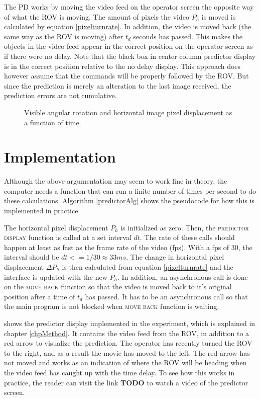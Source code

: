 The PD works by moving the video feed on the operator screen the opposite way of what the ROV is moving. The amount of pixels the video $P_h$ is moved is calculated by equation \ref{pixelturnrate}. In addition, the video is moved back (the same way as the ROV is moving) after $t_d$ seconds has passed. This makes the objects in the video feed appear in the correct position on the operator screen as if there were no delay. Note that the black box in  center column predictor display is in the correct position relative to the no delay display. This approach does however assume that the commands will be properly followed by the ROV. But since the prediction is merely an alteration to the last image received, the prediction errors are not cumulative.


\begin{figure}[h!]    
    \centering           
    \def\svgwidth{\columnwidth}
    
    \caption{Visible angular rotation and horizontal image pixel displacement as a function of time.}
    \label{timePlot}
\end{figure}

\section{Implementation}

Although the above argumentation may seem to work fine in theory, the computer needs a function that can run a finite number of times per second to do these calculations. Algorithm \ref{predictorAlg} shows the pseudocode for how this is implemented in practice.

The horizontal pixel displacement $P_h$ is initialized as zero. Then, the \textsc{predictor display} function is called at a set interval $dt$. The rate of these calls should happen at least as fast as the frame rate of the video (fps). With a fps of 30, the interval should be $dt <= 1/30 \approx 33 ms$. The change in horizontal pixel displacement $\Delta P_h$ is then calculated from equation \ref{pixelturnrate} and the interface is updated with the new $P_h$. In addition, an asynchronous call is done on the \textsc{move back} function so that the video is moved back to it's original position after a time of $t_d$ has passed. It has to be an asynchronous call so that the main program is not blocked when \textsc{move back} function is waiting.




 shows the predictor display implemented in the experiment, which is explained in chapter \ref{chpMethod}. It contains the video feed from the ROV, in addition to a red arrow to visualize the prediction. The operator has recently turned the ROV to the right, and as a result the movie has moved to the left. The red arrow has not moved and works as an indication of where the ROV will be heading when the video feed has caught up with the time delay. To see how this works in practice, the reader can visit the link \textbf{TODO} to watch a video of the predictor screen.

